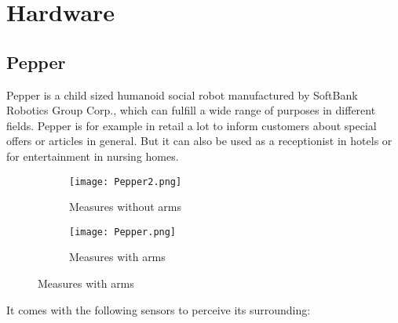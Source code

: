\chapter{Hardware}
\label{cha:hardware}
\section{Pepper}
\label{sec:pepper}
Pepper is a child sized humanoid social robot manufactured by SoftBank Robotics Group Corp.,
which can fulfill a wide range of purposes in different fields. Pepper is for example in
retail a lot to inform customers about special offers or articles in general. But it can also
be used as a receptionist in hotels or for entertainment in nursing homes.

\begin{figure}
\centering
\begin{subfigure}{.5\textwidth}
  \centering
  \texttt{[image: Pepper2.png]}
  \caption{Measures without arms \cite{Pepper2018}}
\end{subfigure}%
\begin{subfigure}{.5\textwidth}
  \centering
  \texttt{[image: Pepper.png]}
  \caption{Measures with arms \cite{Pepper2018}}
\end{subfigure}
\label{fig:pepper}
\end{figure}


It comes with the following sensors to perceive its surrounding:
